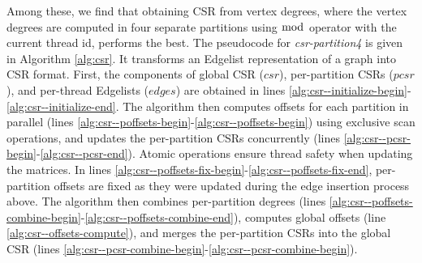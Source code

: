 Among these, we find that obtaining CSR from vertex degrees, where the vertex degrees are computed in four separate partitions using $\bmod$ operator with the current thread id, performs the best. The pseudocode for \textit{csr-partition4} is given in Algorithm \ref{alg:csr}. It transforms an Edgelist representation of a graph into CSR format. First, the components of global CSR ($csr$), per-partition CSRs ($pcsr$), and per-thread Edgelists ($edges$) are obtained in lines \ref{alg:csr--initialize-begin}-\ref{alg:csr--initialize-end}. The algorithm then computes offsets for each partition in parallel (lines \ref{alg:csr--poffsets-begin}-\ref{alg:csr--poffsets-begin}) using exclusive scan operations, and updates the per-partition CSRs concurrently (lines \ref{alg:csr--pcsr-begin}-\ref{alg:csr--pcsr-end}). Atomic operations ensure thread safety when updating the matrices. In lines \ref{alg:csr--poffsets-fix-begin}-\ref{alg:csr--poffsets-fix-end}, per-partition offsets are fixed as they were updated during the edge insertion process above. The algorithm then combines per-partition degrees (lines \ref{alg:csr--poffsets-combine-begin}-\ref{alg:csr--poffsets-combine-end}), computes global offsets (line \ref{alg:csr--offsets-compute}), and merges the per-partition CSRs into the global CSR (lines \ref{alg:csr--pcsr-combine-begin}-\ref{alg:csr--pcsr-combine-begin}).


